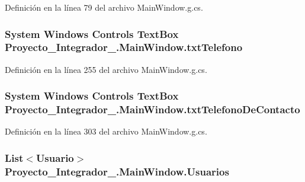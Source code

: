 Definición en la línea 79 del archivo Main\-Window.\-g.\-cs.

\hypertarget{class_proyecto___integrador__3_1_1_main_window_a3d79de440d7968c622d331dd467c8987}{
\subsubsection[{txt\-Telefono}]{\setlength{\rightskip}{0pt plus 5cm}System Windows Controls Text\-Box Proyecto\-\_\-\-Integrador\-\_.\-Main\-Window.\-txt\-Telefono\hspace{0.3cm}{\ttfamily [package]}}}\label{class_proyecto___integrador__3_1_1_main_window_a3d79de440d7968c622d331dd467c8987}


Definición en la línea 255 del archivo Main\-Window.\-g.\-cs.

\hypertarget{class_proyecto___integrador__3_1_1_main_window_a0103b8eb21ee11204623d0f08a6acdaf}{
\subsubsection[{txt\-Telefono\-De\-Contacto}]{\setlength{\rightskip}{0pt plus 5cm}System Windows Controls Text\-Box Proyecto\-\_\-\-Integrador\-\_.\-Main\-Window.\-txt\-Telefono\-De\-Contacto\hspace{0.3cm}{\ttfamily [package]}}}\label{class_proyecto___integrador__3_1_1_main_window_a0103b8eb21ee11204623d0f08a6acdaf}


Definición en la línea 303 del archivo Main\-Window.\-g.\-cs.

\hypertarget{class_proyecto___integrador__3_1_1_main_window_aa96755d8e5d995f2a6fcc75568ad5b4d}{
\subsubsection[{Usuarios}]{\setlength{\rightskip}{0pt plus 5cm}List$<${\bf Usuario}$>$ Proyecto\-\_\-\-Integrador\-\_.\-Main\-Window.\-Usuarios\hspace{0.3cm}{\ttfamily [private]}}}\label{class_proyecto___integrador__3_1_1_main_window_aa96755d8e5d995f2a6fcc75568ad5b4d}


